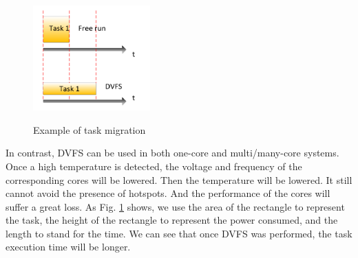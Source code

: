 \begin{figure}
  \centering
     {
       \includegraphics[width=0.4\textwidth]{fig/DVFS}
     }
     \caption{Example of task migration}\label{DVFS}
\end{figure}


In contrast, DVFS can be used in both one-core and multi/many-core systems. Once a high temperature is detected, the voltage and frequency of the corresponding cores will be lowered. Then the temperature will be lowered. It still cannot avoid the presence of hotspots. And the performance of the cores will suffer a great loss. As Fig. \ref{DVFS} shows, we use the area of the rectangle to represent the task, the height of the rectangle to represent the power consumed, and the length to stand for the time. We can see that once DVFS was performed, the task execution time will be longer.

